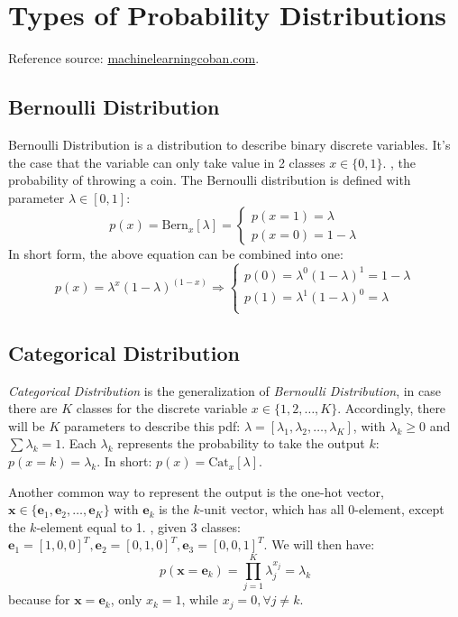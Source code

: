 \section{Types of Probability Distributions}
Reference source: \href{https://machinelearningcoban.com/2017/07/09/prob/}{machinelearningcoban.com}.
\subsection{Bernoulli Distribution}
Bernoulli Distribution is a distribution to describe binary discrete variables. It's the case that the variable can only take value in 2 classes $x \in \{0,1\}$. \Eg, the probability of throwing a coin. The Bernoulli distribution is defined with parameter $\lambda \in[0,1]$:
\begin{equation}
	p(x) = \text{Bern}_x[\lambda] = \begin{cases}
		p(x=1) = \lambda\\
		p(x=0) = 1-\lambda
	\end{cases}
\end{equation}
In short form, the above equation can be combined into one:
\begin{equation}
	p(x) = \lambda^x(1-\lambda)^{(1-x)} \Rightarrow
	\begin{cases}
		p(0) = \lambda^0 (1-\lambda)^1 = 1-\lambda \\
		p(1) = \lambda^1 (1-\lambda)^0 = \lambda \\
	\end{cases}
\end{equation}

\subsection{Categorical Distribution}
\label{subsec:categorical-distribution}
\textit{Categorical Distribution} is the generalization of \textit{Bernoulli Distribution}, in case there are $K$ classes for the discrete variable $x \in \{ 1, 2, \dots, K\}$. Accordingly, there will be $K$ parameters to describe this \ac{pdf}: $\lambda = [\lambda_1, \lambda_2, \dots, \lambda_K]$, with $\lambda_k \geq 0$ and $\sum \lambda_k = 1$. Each $\lambda_k$ represents the probability to take the output $k$: $p(x = k) = \lambda_k$. In short: $p(x) = \text{Cat}_x [\lambda]$.

Another common way to represent the output is the one-hot vector, $\mathbf{x} \in \{\mathbf{e}_1, \mathbf{e}_2, \dots, \mathbf{e}_K\}$ with $\mathbf{e}_k$ is the $k$-unit vector, which has all 0-element, except the $k$-element equal to 1. \Eg, given 3 classes: $\textbf{e}_1 = [1, 0, 0]^T, \textbf{e}_2 = [0, 1, 0]^T, \textbf{e}_3 = [0, 0, 1]^T$. We will then have:
\begin{equation}
	p(\mathbf{x} = \mathbf{e}_k) = \prod_{j=1}^K \lambda_j^{x_j} = \lambda_k
\end{equation}
because for $\textbf{x}=\textbf{e}_k$, only $x_k=1$, while $x_j = 0, \forall j\neq k$.

